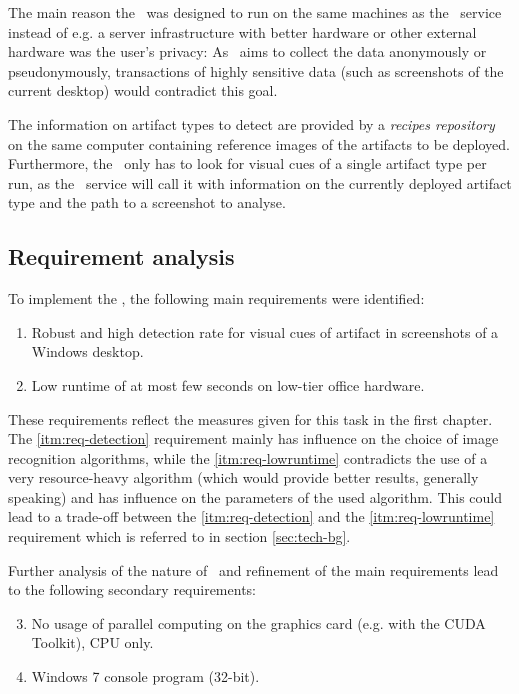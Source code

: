 The main reason the \vd~was designed to run on the same machines as the \ape~service instead of e.g. a server infrastructure with better hardware or other external hardware was the user's privacy:  As \ape~aims to collect the data anonymously or pseudonymously, transactions of highly sensitive data (such as screenshots of the current desktop) would contradict this goal.

The information on artifact types to detect are provided by a \emph{recipes repository} on the same computer containing reference images of the artifacts to be deployed. Furthermore, the \vd~only has to look for visual cues of a single artifact type per run, as the \ape~service will call it with information on the currently deployed artifact type and the path to a screenshot to analyse.

\subsection{Requirement analysis}

To implement the \vd, the following main requirements were identified:

\begin{enumerate}
	\item \label{itm:req-detection} Robust and high detection rate for visual cues of artifact in screenshots of a Windows desktop.
	\item \label{itm:req-lowruntime} Low runtime of at most few seconds on low-tier office hardware.
\end{enumerate}

These requirements reflect the measures given for this task in the first chapter. The \ref{itm:req-detection} requirement mainly has influence on the choice of image recognition algorithms, while the \ref{itm:req-lowruntime} contradicts the use of a very resource-heavy algorithm (which would provide better results, generally speaking) and has influence on the parameters of the used algorithm. This could lead to a trade-off between the \ref{itm:req-detection} and the \ref{itm:req-lowruntime} requirement which is referred to in section \ref{sec:tech-bg}.

Further analysis of the nature of \ape~and refinement of the main requirements lead to the following secondary requirements:

\begin{enumerate}\setcounter{enumi}{2}
	\item \label{itm:req-nocuda} No usage of parallel computing on the graphics card (e.g. with the CUDA Toolkit\cite{cuda}), CPU only.
	\item \label{itm:req-win7console} Windows 7 console program (32-bit).
\end{enumerate}

